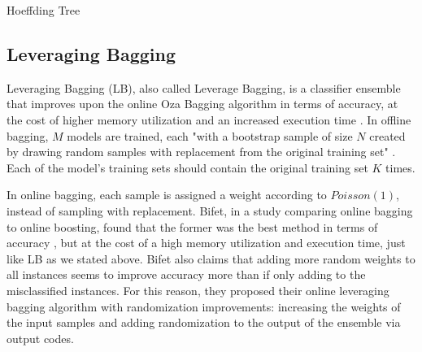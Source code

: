 \begin{algorithm}
\caption{Hoeffding Tree\label{alg:vfdt} \cite{bifet2018machine}}
\setcounter{AlgoLine}{0}
\end{algorithm}

\subsection{Leveraging Bagging\label{section:leveraging-bagging}}
Leveraging Bagging (LB), also called Leverage Bagging, is a classifier ensemble that improves upon the online Oza Bagging algorithm in terms of accuracy, at the cost of higher memory utilization and an increased execution time \cite{bifet2010leveraging}. In offline bagging, $M$ models are trained, each "with a bootstrap sample of size $N$ created by drawing random samples with replacement from the original training set" \cite{bifet2010leveraging}. Each of the model's training sets should contain the original training set $K$ times.

In online bagging, each sample is assigned a weight according to $Poisson(1)$, instead of sampling with replacement. Bifet, in a study comparing online bagging to online boosting, found that the former was the best method in terms of accuracy \cite{bifet2009new}, but at the cost of a high memory utilization and execution time, just like LB as we stated above. Bifet also claims that adding more random weights to all instances seems to improve accuracy more than if only adding to the misclassified instances. For this reason, they proposed their online leveraging bagging algorithm with randomization improvements: increasing the weights of the input samples and adding randomization to the output of the ensemble via output codes.

